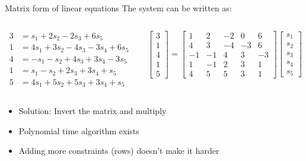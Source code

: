 \documentclass[aspectratio=169, lualatex, handout]{beamer}
\begin{document}
\begin{frame}{Matrix form of linear equations}
	The system can be written as:
	\begin{columns}[c]
		\begin{column}{0.5\textwidth}
			\begin{align*}
				3 & = s_1 + 2s_2 - 2s_3 + 6s_5         \\
				1 & = 4s_1 + 3s_2 - 4s_3 - 3s_4 + 6s_5 \\
				4 & = -s_1 - s_2 + 4s_3 + 3s_4 - 3s_5  \\
				1 & = s_1 - s_2 + 2s_3 + 3s_4 + s_5    \\
				5 & = 4s_1 + 5s_2 + 5s_3 + 3s_4 + s_5
			\end{align*}
		\end{column}
		\begin{column}{0.5\textwidth}
			\[
				\begin{bmatrix}
					3 \\ 1 \\ 4 \\ 1 \\ 5
				\end{bmatrix}
				=
				\begin{bmatrix}
					1  & 2  & -2 & 0  & 6  \\
					4  & 3  & -4 & -3 & 6  \\
					-1 & -1 & 4  & 3  & -3 \\
					1  & -1 & 2  & 3  & 1  \\
					4  & 5  & 5  & 3  & 1
				\end{bmatrix}
				\begin{bmatrix}
					s_1 \\ s_2 \\ s_3 \\ s_4 \\ s_5
				\end{bmatrix}
			\]
		\end{column}
	\end{columns}
	\vspace{5mm}
	\begin{itemize}
		\item Solution: Invert the matrix and multiply
		\item Polynomial time algorithm exists
		\item Adding more constraints (rows) doesn't make it harder
	\end{itemize}
\end{frame}
\end{document}
